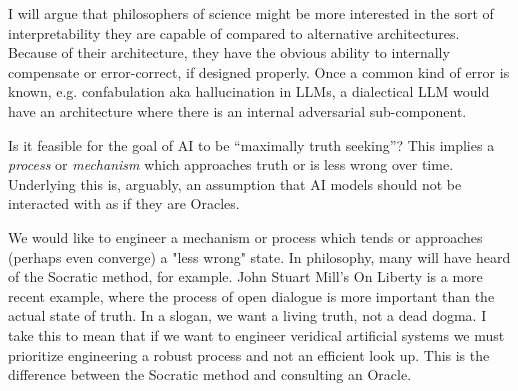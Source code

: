 \documentclass[11pt, oneside]{article}   	%
\begin{document}



























I will argue that philosophers of science might be more interested in the sort of interpretability they are capable of compared to alternative architectures.  Because of their architecture, they have the obvious ability to internally compensate or error-correct, if designed properly.  Once a common kind of error is known, e.g. confabulation aka hallucination in LLMs, a dialectical LLM would have an architecture where there is an internal adversarial sub-component.



Is it feasible for the goal of AI to be ``maximally truth seeking''?  This implies a \emph{process} or \emph{mechanism} which approaches truth or is less wrong over time.  Underlying this is, arguably, an assumption that AI models should not be interacted with as if they are Oracles.  



We would like to engineer a mechanism or process which tends or approaches (perhaps even converge) a "less wrong" state.  In philosophy, many will have heard of the Socratic method, for example.  John Stuart Mill's On Liberty is a more recent example, where the process of open dialogue is more important than the actual state of truth.  In a slogan, we want a living truth, not a dead dogma.  I take this to mean that if we want to engineer veridical artificial systems we must prioritize engineering a robust process and not an efficient look up.  This is the difference between the Socratic method and consulting an Oracle.
\end{document}
